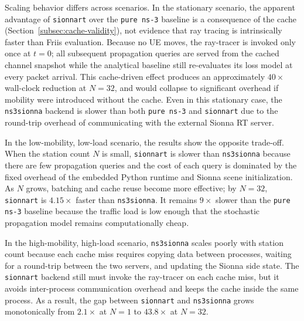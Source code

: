 Scaling behavior differs across scenarios.
In the stationary scenario, the apparent advantage of \texttt{sionnart} over the \texttt{pure ns-3} baseline is a consequence of the cache (Section~\ref{subsec:cache-validity}), not evidence that ray tracing is intrinsically faster than Friis evaluation.
Because no UE moves, the ray-tracer is invoked only once at $t=0$; all subsequent propagation queries are served from the cached channel snapshot while the analytical baseline still re-evaluates its loss model at every packet arrival.
This cache-driven effect produces an approximately $40\times$ wall-clock reduction at $N=32$, and would collapse to significant overhead if mobility were introduced without the cache.
Even in this stationary case, the \texttt{ns3sionna} backend is slower than both \texttt{pure ns-3} and \texttt{sionnart} due to the round-trip overhead of communicating with the external Sionna RT server.

In the low-mobility, low-load scenario, the results show the opposite trade-off.
When the station count $N$ is small, \texttt{sionnart} is slower than \texttt{ns3sionna} because there are few propagation queries and the cost of each query is dominated by the fixed overhead of the embedded Python runtime and Sionna scene initialization.
As $N$ grows, batching and cache reuse become more effective; by $N=32$, \texttt{sionnart} is $4.15\times$ faster than \texttt{ns3sionna}.
It remains $9\times$ slower than the \texttt{pure ns-3} baseline because the traffic load is low enough that the stochastic propagation model remains computationally cheap.

In the high-mobility, high-load scenario, \texttt{ns3sionna} scales poorly with station count because each cache miss requires copying data between processes, waiting for a round-trip between the two servers, and updating the Sionna side state.
The \texttt{sionnart} backend still must invoke the ray-tracer on each cache miss, but it avoids inter-process communication overhead and keeps the cache inside the same process.
As a result, the gap between \texttt{sionnart} and \texttt{ns3sionna} grows monotonically from $2.1\times$ at $N=1$ to $43.8\times$ at $N=32$.
